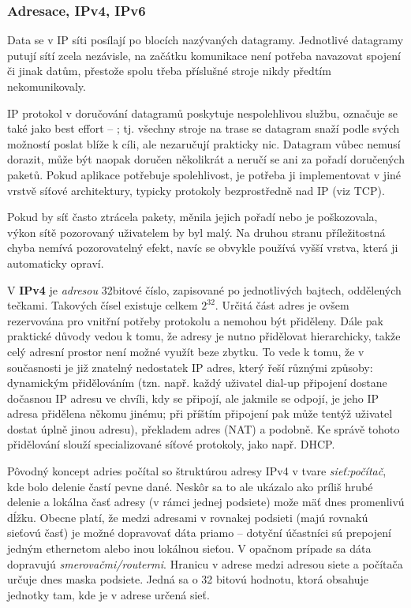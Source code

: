 \subsubsection*{Adresace, IPv4, IPv6}
Data se v IP síti posílají po blocích nazývaných datagramy. Jednotlivé datagramy putují sítí zcela nezávisle, na začátku komunikace není potřeba navazovat spojení či jinak  datům, přestože spolu třeba příslušné stroje nikdy předtím nekomunikovaly.

IP protokol v doručování datagramů poskytuje nespolehlivou službu, označuje se také jako best effort – ; tj. všechny stroje na trase se datagram snaží podle svých možností poslat blíže k cíli, ale nezaručují prakticky nic. Datagram vůbec nemusí dorazit, může být naopak doručen několikrát a neručí se ani za pořadí doručených paketů. Pokud aplikace potřebuje spolehlivost, je potřeba ji implementovat v jiné vrstvě síťové architektury, typicky protokoly bezprostředně nad IP (viz TCP).

Pokud by síť často ztrácela pakety, měnila jejich pořadí nebo je poškozovala, výkon sítě pozorovaný uživatelem by byl malý. Na druhou stranu příležitostná chyba nemívá pozorovatelný efekt, navíc se obvykle používá vyšší vrstva, která ji automaticky opraví.

V \textbf{IPv4} je \emph{adresou} 32bitové číslo, zapisované po jednotlivých bajtech, oddělených tečkami. Takových čísel existuje celkem $2^{32}$. Určitá část adres je ovšem rezervována pro vnitřní potřeby protokolu a nemohou být přiděleny. Dále pak praktické důvody vedou k tomu, že adresy je nutno přidělovat hierarchicky, takže celý adresní prostor není možné využít beze zbytku. To vede k tomu, že v současnosti je již znatelný nedostatek IP adres, který řeší různými způsoby: dynamickým přidělováním (tzn. např. každý uživatel dial-up připojení dostane dočasnou IP adresu ve chvíli, kdy se připojí, ale jakmile se odpojí, je jeho IP adresa přidělena někomu jinému; při příštím připojení pak může tentýž uživatel dostat úplně jinou adresu), překladem adres (NAT) a podobně. Ke správě tohoto přidělování slouží specializované síťové protokoly, jako např. DHCP.

Pôvodný koncept adries počítal so štruktúrou adresy IPv4 v tvare \emph{sieť:počítač}, kde bolo delenie častí pevne dané. Neskôr sa to ale ukázalo ako príliš hrubé delenie a lokálna časť adresy (v rámci jednej podsiete) može mäť dnes promenlivú dĺžku. Obecne platí, že medzi adresami v rovnakej podsieti (majú rovnakú sieťovú časť) je možné dopravovať dáta priamo -- dotyční účastníci sú prepojení jedným ethernetom alebo inou lokálnou sieťou. V opačnom prípade sa dáta dopravujú \emph{smerovačmi/routermi}. Hranicu v adrese medzi adresou siete a počítača určuje dnes maska podsiete. Jedná sa o 32 bitovú hodnotu, ktorá obsahuje jednotky tam, kde je v adrese určená sieť.

